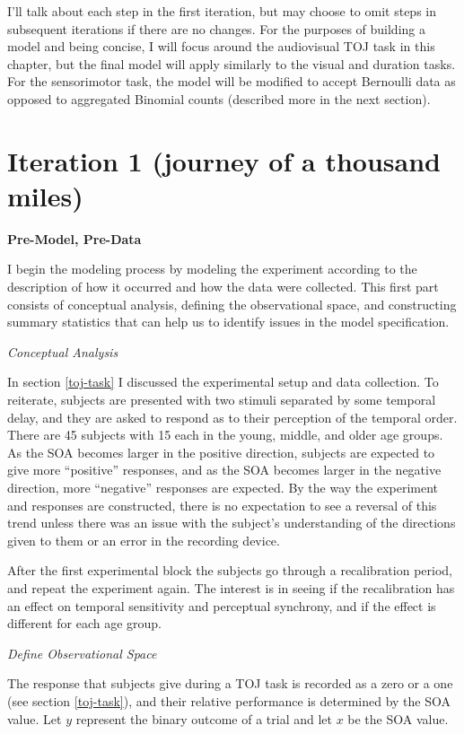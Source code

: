 \documentclass[11pt, oneside, openany]{scrbook}
\begin{document}
I'll talk about each step in the first iteration, but may choose to omit steps in subsequent iterations if there are no changes. For the purposes of building a model and being concise, I will focus around the audiovisual TOJ task in this chapter, but the final model will apply similarly to the visual and duration tasks. For the sensorimotor task, the model will be modified to accept Bernoulli data as opposed to aggregated Binomial counts (described more in the next section).

\hypertarget{iter1}{%
\section{Iteration 1 (journey of a thousand miles)}\label{iter1}}

\textbf{Pre-Model, Pre-Data}

I begin the modeling process by modeling the experiment according to the description of how it occurred and how the data were collected. This first part consists of conceptual analysis, defining the observational space, and constructing summary statistics that can help us to identify issues in the model specification.

\emph{Conceptual Analysis}

In section \ref{toj-task} I discussed the experimental setup and data collection. To reiterate, subjects are presented with two stimuli separated by some temporal delay, and they are asked to respond as to their perception of the temporal order. There are 45 subjects with 15 each in the young, middle, and older age groups. As the SOA becomes larger in the positive direction, subjects are expected to give more ``positive'' responses, and as the SOA becomes larger in the negative direction, more ``negative'' responses are expected. By the way the experiment and responses are constructed, there is no expectation to see a reversal of this trend unless there was an issue with the subject's understanding of the directions given to them or an error in the recording device.

After the first experimental block the subjects go through a recalibration period, and repeat the experiment again. The interest is in seeing if the recalibration has an effect on temporal sensitivity and perceptual synchrony, and if the effect is different for each age group.

\emph{Define Observational Space}

The response that subjects give during a TOJ task is recorded as a zero or a one (see section \ref{toj-task}), and their relative performance is determined by the SOA value. Let \(y\) represent the binary outcome of a trial and let \(x\) be the SOA value.
\end{document}
